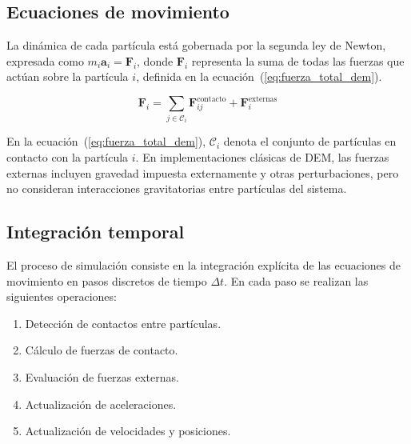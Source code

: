 \documentclass[a4paper,11pt]{book}
\newcommand{\red}[1]{\textcolor{red}{#1}}
\begin{document}
\subsection{Ecuaciones de movimiento}

La dinámica de cada partícula está gobernada por la segunda ley de Newton, expresada como 	$m_i \mathbf{a}_i = \mathbf{F}_i$, donde $\mathbf{F}_i$ representa la suma de todas las fuerzas que actúan sobre la partícula $i$, definida en la ecuación~(\ref{eq:fuerza_total_dem}).





\begin{equation}
	\mathbf{F}_i = \sum_{j \in \mathcal{C}_i} \mathbf{F}_{ij}^{\text{contacto}} + \mathbf{F}_i^{\text{externas}}
	\label{eq:fuerza_total_dem}
\end{equation}

En la ecuación~(\ref{eq:fuerza_total_dem}), $\mathcal{C}_i$ denota el conjunto de partículas en contacto con la partícula $i$. En implementaciones clásicas de DEM, las fuerzas externas incluyen gravedad impuesta externamente y otras perturbaciones, pero no consideran interacciones gravitatorias entre partículas del sistema.

\subsection{Integración temporal}

El proceso de simulación consiste en la integración explícita de las ecuaciones de movimiento en pasos discretos de tiempo $\Delta t$. En cada paso se realizan las siguientes operaciones:

\begin{enumerate}
	\item Detección de contactos entre partículas.
	\item Cálculo de fuerzas de contacto.
	\item Evaluación de fuerzas externas.
	\item Actualización de aceleraciones.
	\item Actualización de velocidades y posiciones.
\end{enumerate}
\end{document}

